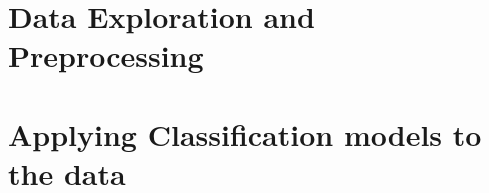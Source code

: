 \documentclass{article}
\numberwithin{equation}{section}
\theoremstyle{definition}
\theoremstyle{plain}
\theoremstyle{definition}
\theoremstyle{remark}
\begin{document}
\section{Data Exploration and Preprocessing}

\section{Applying Classification models to the data}



\end{document}
